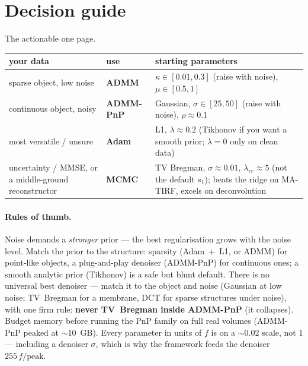 \section{Decision guide}
\label{sec:decision}

The actionable one page.

\begin{center}
\begin{tabular}{p{4.3cm}p{3.0cm}p{5.6cm}}
\toprule
your data & use & starting parameters \\
\midrule
sparse object, low noise & \textbf{ADMM} & $\kappa \in [0.01, 0.3]$ (raise with noise),
                          $\mu \in [0.5, 1]$ \\
continuous object, noisy & \textbf{ADMM-PnP} & Gaussian, $\sigma \in [25, 50]$ (raise with noise),
                          $\rho \approx 0.1$ \\
most versatile / unsure & \textbf{Adam} & L1, $\lambda \approx 0.2$ (Tikhonov if you want a smooth
                          prior; $\lambda=0$ only on clean data) \\
uncertainty / MMSE, or a middle-ground reconstructor & \textbf{MCMC} & TV Bregman, $\sigma \approx 0.01$,
                          $\lambda_{rr} \approx 5$ (not the default $s_1$); beats the ridge on
                          MA-TIRF, excels on deconvolution \\
\bottomrule
\end{tabular}
\end{center}

\paragraph{Rules of thumb.}
Noise demands a \emph{stronger} prior --- the best regularisation grows with the noise level.
Match the prior to the structure: sparsity (Adam~+~L1, or ADMM) for point-like objects, a
plug-and-play denoiser (ADMM-PnP) for continuous ones; a smooth analytic prior (Tikhonov) is a
safe but blunt default. There is no universal best denoiser --- match it to the object and noise
(Gaussian at low noise; TV~Bregman for a membrane, DCT for sparse structures under noise), with one
firm rule: \textbf{never TV~Bregman inside ADMM-PnP} (it collapses). Budget memory before running
the PnP family on full real volumes (ADMM-PnP peaked at ${\sim}10$~GB). Every parameter in units of $f$ is on a
${\sim}0.02$ scale, not $1$ --- including a denoiser $\sigma$, which is why the framework feeds the
denoiser $255\,f/\text{peak}$.
